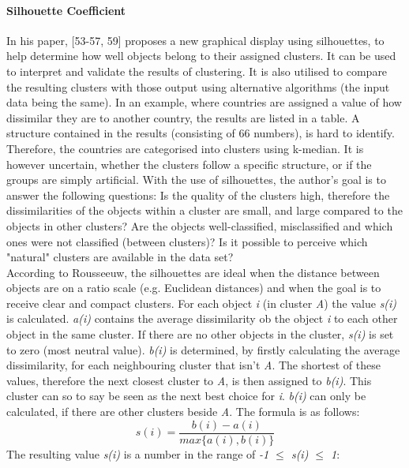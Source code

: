   \paragraph{Silhouette Coefficient}
  In his paper, \textcite{rousseeuw1987silhouettes}[53-57, 59] proposes a new graphical display using silhouettes, to help determine how well objects belong to their assigned clusters. It can be used to interpret and validate the results of clustering. It is also utilised to compare the resulting clusters with those output using alternative algorithms (the input data being the same). In an example, where countries are assigned a value of how dissimilar they are to another country, the results are listed in a table. A structure contained in the results (consisting of 66 numbers), is hard to identify. Therefore, the countries are categorised into clusters using k-median. It is however uncertain, whether the clusters follow a specific structure, or if the groups are simply artificial. With the use of silhouettes, the author's goal is to answer the following questions: Is the quality of the clusters high, therefore the dissimilarities of the objects within a cluster are small, and large compared to the objects in other clusters? Are the objects well-classified, misclassified and which ones were not classified (between clusters)? Is it possible to perceive which "natural" clusters are available in the data set? \\
  According to Rousseeuw, the silhouettes are ideal when the distance between objects are on a ratio scale (e.g. Euclidean distances) and when the goal is to receive clear and compact clusters. For each object \textit{i} (in cluster \textit{A}) the value \textit{s(i)} is calculated. \textit{a(i)} contains the average dissimilarity ob the object \textit{i} to each other object in the same cluster. If there are no other objects in the cluster, \textit{s(i)} is set to zero (most neutral value). \textit{b(i)} is determined, by firstly calculating the average dissimilarity, for each neighbouring cluster that isn't \textit{A}. The shortest of these values, therefore the next closest cluster to \textit{A}, is then assigned to \textit{b(i)}. This cluster can so to say be seen as the next best choice for \textit{i}. \textit{b(i)} can only be calculated, if there are other clusters beside \textit{A}.
  The formula is as follows:
  \[
    s(i) = \frac{b(i) - a(i)}{max\{a(i), b(i)\}}  
  \]
  The resulting value \textit{s(i)} is a number in the range of \textit{-1 $\leq$ \textit{s(i)} $\leq$ 1}:

